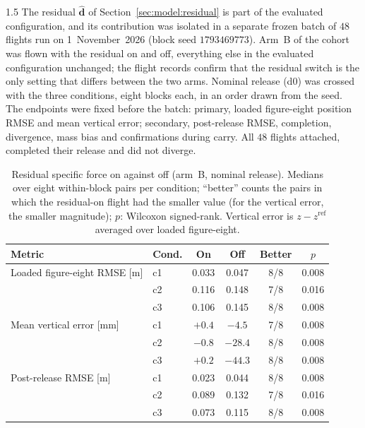 \begin{spacing}{1.5}
The residual $\hat{\bm d}$ of Section~\ref{sec:model:residual} is part of the
evaluated configuration, and its contribution was isolated in a separate frozen
batch of $48$ flights run on 1~November~2026 (block seed $1793469773$). Arm~B of
the cohort was flown with the residual on and off, everything else in the
evaluated configuration unchanged; the flight records confirm that the residual
switch is the only setting that differs between the two arms. Nominal release
(d0) was crossed with the three conditions, eight blocks each, in an order drawn
from the seed. The endpoints were fixed before the batch: primary, loaded
figure-eight position RMSE and mean vertical error; secondary, post-release
RMSE, completion, divergence, mass bias and confirmations during carry. All
$48$ flights attached, completed their release and did not diverge.

\begin{table}[ht]
\centering
\caption[Residual specific force on against off]{Residual specific force on against off (arm~B, nominal release).
Medians over eight within-block pairs per condition; ``better'' counts the pairs
in which the residual-on flight had the smaller value (for the vertical error,
the smaller magnitude); $p$: Wilcoxon signed-rank. Vertical error is
$z-z^{\mathrm{ref}}$ averaged over loaded figure-eight.}
\label{tab:l1ablation}
\small
\begin{tabular}{@{}l l c c c c@{}}
\toprule
\textbf{Metric} & \textbf{Cond.} & \textbf{On} & \textbf{Off} &
\textbf{Better} & $p$ \\
\midrule
Loaded figure-eight RMSE [m] & c1 & 0.033 & 0.047 & 8/8 & 0.008 \\
                             & c2 & 0.116 & 0.148 & 7/8 & 0.016 \\
                             & c3 & 0.106 & 0.145 & 8/8 & 0.008 \\
\midrule
Mean vertical error [mm]     & c1 & $+0.4$ & $-4.5$ & 7/8 & 0.008 \\
                             & c2 & $-0.8$ & $-28.4$ & 8/8 & 0.008 \\
                             & c3 & $+0.2$ & $-44.3$ & 8/8 & 0.008 \\
\midrule
Post-release RMSE [m]        & c1 & 0.023 & 0.044 & 8/8 & 0.008 \\
                             & c2 & 0.089 & 0.132 & 7/8 & 0.016 \\
                             & c3 & 0.073 & 0.115 & 8/8 & 0.008 \\
\bottomrule
\end{tabular}
\end{table}


\end{spacing}
